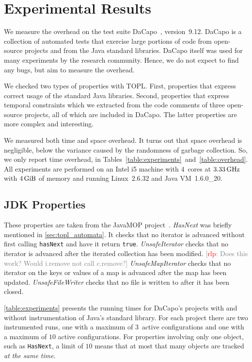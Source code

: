 \documentclass{article} %
\newcommand{\noterg}[2]{\textcolor{gray}{[\textcolor{red}{#1}: #2]}}
\newcommand{\rlp}[1]{\noterg{rlp}{#1}}
\theoremstyle{definition}
\theoremstyle{remark}
\begin{document}
\section{Experimental Results}\label{sec:results} %

We measure the overhead on the test suite DaCapo~\cite{dblp:conf/oopsla/dacapo}, version~9.12.
DaCapo is a collection of automated tests that exercise large portions of code from open-source projects and from the Java standard libraries.
DaCapo itself was used for many experiments by the research community.
Hence, we do not expect to find any bugs, but aim to measure the overhead.

We checked two types of properties with TOPL\null.
First, properties that express correct usage of the standard Java libraries.
Second, properties that express temporal constraints which we extracted from the code comments of three open-source projects, all of which are included in DaCapo.
The latter properties are more complex and interesting.

We measured both time and space overhead. It turns out that space
overhead is negligible, below the variance caused by the randomness of garbage collection.
So, we only report time overhead, in Tables~\ref{table:experiments}~and~\ref{table:overhead}.
%
All experiments are performed on an Intel i5 machine with $4$~cores at $3.33\rm\,GHz$ with  $4\rm\,GiB$ of memory and 
running Linux~2.6.32 and Java VM~1.6.0\_20.

\subsection{JDK Properties} %

These properties are taken from the JavaMOP project~\cite{dblp:journals/sttt/meredithjgcr12}.
\emph{HasNext}
 was briefly mentioned in \autoref{sec:topl_automata}. It
checks that no iterator is advanced without first calling {\tt hasNext}
and have it return {\tt true}.
\emph{UnsafeIterator}
 checks that no iterator is advanced after the iterated
collection has been modified. \rlp{Does this work? Would i.remove not
  call c.remove?}
\emph{UnsafeMapIterator}
 checks that no iterator on the keys or values of a map
is advanced after the map has been updated.
\emph{UnsafeFileWriter}
 checks that no file is written to after it has been closed.

\medskip
\autoref{table:experiments} presents the running times for DaCapo's projects with and without instrumentation of Java's standard library.
For each project there are two instrumented runs, one with a maximum of $3$~active configurations and one with a maximum of $10$ active configurations.
For properties involving only one object, such as {\tt HasNext}, a limit of $10$ means that at most that many objects are tracked \emph{at the same time}.
\end{document}
